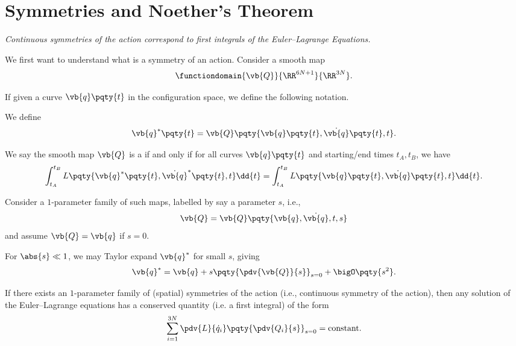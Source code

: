 \section{Symmetries and Noether's Theorem}

\textit{Continuous symmetries of the action correspond to first integrals of the Euler--Lagrange Equations.}

We first want to understand what is a symmetry of an action. Consider a smooth map
\[
    \functiondomain{\vb{Q}}{\RR^{6N + 1}}{\RR^{3N}}.
\]

If given a curve \(\vb{q} \pqty{t}\) in the configuration space, we define the following notation.

\begin{definition}
    We define
    \begin{equation}
        \label{eq:mapping-curve-spatial-symmetry}%
        \vb{q}^{\ast}\pqty{t} = \vb{Q} \pqty{\vb{q} \pqty{t}, \dot{\vb{q}} \pqty{t}, t}.
    \end{equation}
\end{definition}

\begin{definition}
    We say the smooth map \(\vb{Q}\) is a  if and only if for all curves \(\vb{q} \pqty{t}\) and starting/end times \(t_A, t_B\), we have
    \begin{equation}
        \label{eq:symmetry-of-action}%
        \int_{t_A}^{t_B} L\pqty{\vb{q}^{\ast} \pqty{t}, \dot{\vb{q}}^{\ast} \pqty{t}, t} \dd{t} = \int_{t_A}^{t_B} L \pqty{\vb{q} \pqty{t}, \dot{\vb{q}} \pqty{t}, t} \dd{t}.
    \end{equation}
\end{definition}

Consider a \(1\)-parameter family of such maps, labelled by say a parameter \(s\), i.e.,
\[
    \vb{Q} = \vb{Q} \pqty{\vb{q}, \dot{\vb{q}}, t, s}
\]
and assume \(\vb{Q} = \vb{q}\) if \(s = 0\).

For \(\abs{s} \ll 1\), we may Taylor expand \(\vb{q}^{\ast}\) for small \(s\), giving
\begin{equation}
    \label{eq:image-curve-taylor}%
    \vb{q}^{\ast} = \vb{q} + s \pqty{\pdv{\vb{Q}}{s}}_{s = 0} + \bigO \pqty{s^2}.
\end{equation}

\begin{theorem}
    \label{thm:noether-thm-ver-1}%
    If there exists an \(1\)-parameter family of (spatial) symmetries of the action (i.e., continuous symmetry of the action), then any solution of the Euler--Lagrange equations has a conserved quantity (i.e. a first integral) of the form
    \[
        \sum_{i = 1}^{3N} \pdv{L}{\dot{q}_i} \pqty{\pdv{Q_i}{s}}_{s = 0} = \text{constant}.
    \]
\end{theorem}

